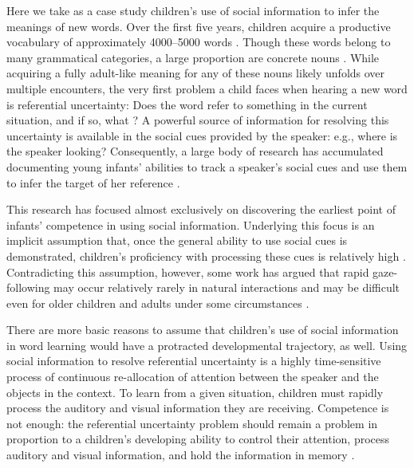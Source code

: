 \documentclass{pnastwo}
\begin{document}
\begin{article}
Here we take as a case study children's use of social information to infer the meanings of new words. Over the first five years, children acquire a productive vocabulary of approximately 4000--5000 words \cite{goulden1990}. Though these words belong to many grammatical categories, a large proportion are concrete nouns \cite{bates1994}. While acquiring a fully adult-like meaning for any of these nouns likely unfolds over multiple encounters, the very first problem a child faces when hearing a new word is referential uncertainty: Does the word refer to something in the current situation, and if so, what \cite{carey1978, yu2007, frank2009}? A powerful source of information for resolving this uncertainty is available in the social cues provided by the speaker: e.g., where is the speaker looking? Consequently, a large body of research has accumulated documenting young infants' abilities to track a speaker's social cues and use them to infer the target of her reference \cite[e.g.][]{scaife1975, baldwin1993, hollich2000, senju2008}.

This research has focused almost exclusively on discovering the earliest point of infants' competence in using social information. Underlying this focus is an implicit assumption that, once the general ability to use social cues is demonstrated, children's proficiency with processing these cues is relatively high \cite[e.g.][]{corkum1998, brooks2005, csibra2009}. Contradicting this assumption, however, some work has argued that rapid gaze-following may occur relatively rarely in natural interactions and may be difficult even for older children and adults under some circumstances \cite{loomis2008, vida2012, yu2013}.

There are more basic reasons to assume that children's use of social information in word learning would have a protracted developmental trajectory, as well. Using social information to resolve referential uncertainty is a highly time-sensitive process of continuous re-allocation of attention between the speaker and the objects in the context. To learn from a given situation, children must rapidly process the auditory and visual information they are receiving. Competence is not enough: the referential uncertainty problem should remain a problem in proportion to a children's developing ability to control their attention, process auditory and visual information, and hold the information in memory \cite{dempster1981, kail1991, gathercole2004}.


\end{article}
\end{document}
